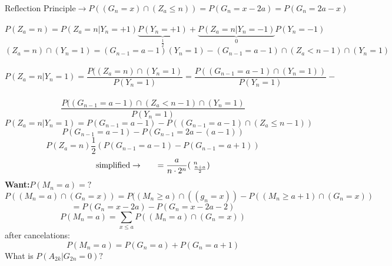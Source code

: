 \begin{displaymath}\mbox{Reflection Principle}\rightarrow P((G_n = x)\cap(Z_a \leq n)) = P(G_n = x-2a) =
P(G_n = 2a-x) \end{displaymath}
\\
\begin{displaymath}P(Z_a = n) = P(Z_a=n|Y_n=+1)\underbrace{P(Y_n=+1)}_\frac{1}{2}+\underbrace{P(Z_a=n|Y_n=-1)}_0P(Y_n=-1)\end{displaymath}
\begin{displaymath}(Z_a = n)\cap(Y_n=1)=(G_{n-1}=a-1)(Y_n=1)-(G_{n-1}=a-1)\cap(Z_a<n-1)\cap(Y_n=1) \end{displaymath}
\\
\begin{displaymath}P(Z_a=n|Y_n=1)=\frac{P((Z_a=n)\cap(Y_n=1)}{P(Y_n=1)}=\frac{P((G_{n-1}=a-1)\cap(Y_n=1))}{P(Y_n=1)}-\end{displaymath}
\\
\begin{displaymath}\frac{P((G_{n-1}=a-1)\cap(Z_a<n-1)\cap(Y_n=1)}{P(Y_n=1)}\end{displaymath}
\begin{displaymath}P(Z_a=n|Y_n=1)=P(G_{n-1}=a-1)-P((G_{n-1}=a-1)\cap(Z_a\leq
n-1))\end{displaymath}
\begin{displaymath}P(G_{n-1}=a-1)-P(G_{n-1}=2a-(a-1))\end{displaymath}
\begin{displaymath}P(Z_a=n)\frac{1}{2}(P(G_{n-1}=a-1)-P(G_{n-1}=a+1))\end{displaymath}
\begin{displaymath}\mbox{simplified}\rightarrow\indent
=\frac{a}{n\cdot 2^n}(\mbox{  }^n_{\frac{n+a}{2}})\end{displaymath}
{\bf Want:\indent\indent}$P(M_n=a)=?$\\
\begin{displaymath}P((M_n=a)\cap(G_n=x))=P((M_n\geq
a)\cap((g_n=x))-P((M_n\geq a+1)\cap(G_n=x))\end{displaymath}
\begin{displaymath}=P(G_n=x-2a)-P(G_n=x-2a-2)\end{displaymath}
\begin{displaymath}P(M_n=a)=\sum_{x\leq a}P((M_n=a)\cap(G_n=x))\end{displaymath}
after cancelations:
\begin{displaymath}P(M_n=a)=P(G_n=a)+P(G_n=a+1)\end{displaymath}
What is $P(A_{2k}|G_{2n}=0)?$\\
